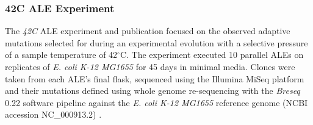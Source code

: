 \documentclass[12pt,final,masters,chapterheads]{ucsd}  %
\begin{document}
\subsubsection{42C ALE Experiment}
The \textit{42C} ALE experiment and publication focused on the observed adaptive mutations selected for during an experimental evolution with a selective pressure of a sample temperature of 42$^{\circ}$C. The experiment executed 10 parallel ALEs on replicates of \textit{E. coli K-12 MG1655} for 45 days in minimal media. Clones were taken from each ALE's final flask, sequenced using the Illumina MiSeq platform and their mutations defined using whole genome re-sequencing with the \textit{Breseq} 0.22 software pipeline against the \textit{E. coli K-12 MG1655} reference genome (NCBI accession NC\_000913.2) \cite{pmid25015645}.
\end{document}
